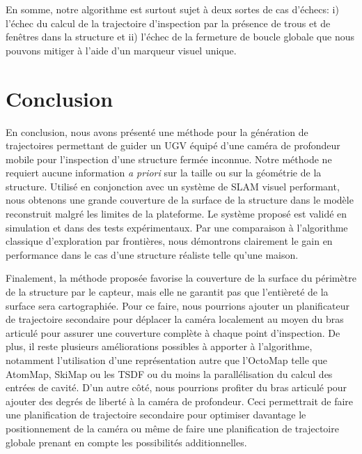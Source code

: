 En somme, notre algorithme est surtout sujet à deux sortes de cas d'échecs: i) l'échec du calcul de la trajectoire d'inspection par la présence de trous et de fenêtres dans la structure et ii) l'échec de la fermeture de boucle globale que nous pouvons mitiger à l'aide d'un marqueur visuel unique.

\section{Conclusion} \label{sec:ugv_conclusion}

En conclusion, nous avons présenté une méthode pour la génération de trajectoires permettant de guider un UGV équipé d'une caméra de profondeur mobile pour l'inspection d'une structure fermée inconnue. Notre méthode ne requiert aucune information \textit{a priori} sur la taille ou sur la géométrie de la structure. Utilisé en conjonction avec un système de SLAM visuel performant, nous obtenons une grande couverture de la surface de la structure dans le modèle reconstruit malgré les limites de la plateforme. Le système proposé est validé en simulation et dans des tests expérimentaux. Par une comparaison à l'algorithme classique d'exploration par frontières, nous démontrons clairement le gain en performance dans le cas d'une structure réaliste telle qu'une maison.

Finalement, la méthode proposée favorise la couverture de la surface du périmètre de la structure par le capteur, mais elle ne garantit pas que l'entièreté de la surface sera cartographiée. Pour ce faire, nous pourrions ajouter un planificateur de trajectoire secondaire pour déplacer la caméra localement au moyen du bras articulé pour assurer une couverture complète à chaque point d'inspection. De plus, il reste plusieurs améliorations possibles à apporter à l'algorithme, notamment l'utilisation d'une représentation autre que l'OctoMap telle que AtomMap, SkiMap ou les TSDF ou du moins la parallélisation du calcul des entrées de cavité. D'un autre côté, nous pourrions profiter du bras articulé pour ajouter des degrés de liberté à la caméra de profondeur. Ceci permettrait de faire une planification de trajectoire secondaire pour optimiser davantage le positionnement de la caméra ou même de faire une planification de trajectoire globale prenant en compte les possibilités additionnelles.
